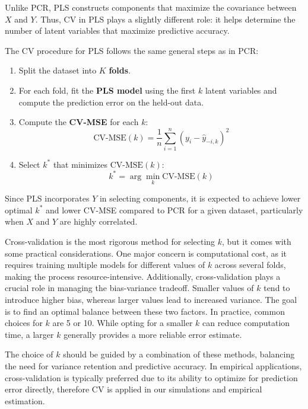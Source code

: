 \documentclass[11pt,twoside,a4paper]{article}
\begin{document}
Unlike PCR, PLS constructs components that maximize the covariance between \( X \) and \( Y \). Thus, CV in PLS plays a slightly different role: it helps determine the number of latent variables that maximize predictive accuracy.

The CV procedure for PLS follows the same general steps as in PCR:
\begin{enumerate}
    \item Split the dataset into \( K \) \textbf{folds}.
    \item For each fold, fit the \textbf{PLS model} using the first \( k \) latent variables and compute the prediction error on the held-out data.
    \item Compute the \textbf{CV-MSE} for each \( k \):
    \begin{equation}
    \text{CV-MSE}(k) = \frac{1}{n} \sum_{i=1}^{n} (y_i - \hat{y}_{-i,k})^2
    \end{equation}
    \item Select \( k^* \) that minimizes \(\text{CV-MSE}(k)\):
    \begin{equation}
    k^* = \arg\min_k \text{CV-MSE}(k)
    \end{equation}
\end{enumerate}

Since PLS incorporates \( Y \) in selecting components, it is expected to achieve lower optimal \( k^* \) and lower CV-MSE compared to PCR for a given dataset, particularly when \( X \) and \( Y \) are highly correlated.

Cross-validation is the most rigorous method for selecting $k$, but it comes with some practical considerations. One major concern is computational cost, as it requires training multiple models for different values of $k$ across several folds, making the process resource-intensive. Additionally, cross-validation plays a crucial role in managing the bias-variance tradeoff. Smaller values of $k$ tend to introduce higher bias, whereas larger values lead to increased variance. The goal is to find an optimal balance between these two factors. In practice, common choices for $k$ are 5 or 10. While opting for a smaller $k$ can reduce computation time, a larger $k$ generally provides a more reliable error estimate.

The choice of \( k \) should be guided by a combination of these methods, balancing the need for variance retention and predictive accuracy. In empirical applications, cross-validation is typically preferred due to its ability to optimize for prediction error directly, therefore CV is applied in our simulations and empirical estimation.
\end{document}
